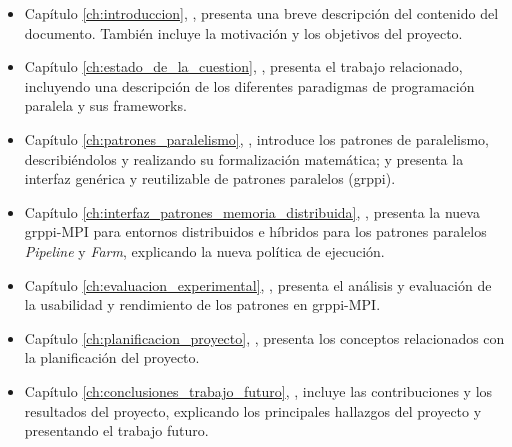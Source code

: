 \begin{itemize}
    \item Capítulo \ref{ch:introduccion}, \textit{}, presenta una breve descripción del contenido del documento. También incluye la motivación y los objetivos del proyecto.
    \item Capítulo \ref{ch:estado_de_la_cuestion}, \textit{}, presenta el trabajo relacionado, incluyendo una descripción de los diferentes paradigmas de programación paralela y sus frameworks.
    \item Capítulo \ref{ch:patrones_paralelismo}, \textit{}, introduce los patrones de paralelismo, describiéndolos y realizando su formalización matemática; y presenta la interfaz genérica y reutilizable de patrones paralelos (\acrshort{grppi}).
    \item Capítulo \ref{ch:interfaz_patrones_memoria_distribuida}, \textit{}, presenta la nueva \acrshort{grppi}-MPI para entornos distribuidos e híbridos para los patrones paralelos \emph{Pipeline} y \emph{Farm}, explicando la nueva política de ejecución.
    \item Capítulo \ref{ch:evaluacion_experimental}, \textit{}, presenta el análisis y evaluación de la usabilidad y rendimiento de los patrones en \acrshort{grppi}-MPI. 
    \item Capítulo \ref{ch:planificacion_proyecto}, \textit{}, presenta los conceptos relacionados con la planificación del proyecto.
    \item Capítulo \ref{ch:conclusiones_trabajo_futuro}, \textit{}, incluye las contribuciones y los resultados del proyecto, explicando los principales hallazgos del proyecto y presentando el trabajo futuro.
\end{itemize}

\afterpage{\blankpage} %


